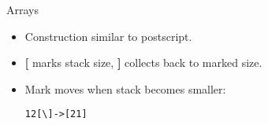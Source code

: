 \documentclass{beamer}
\begin{document}
%
%
%
%
%
%
%
%
%
%
%





\begin{frame}
    Arrays

    \begin{itemize}
        \item Construction similar to postscript.
        \item \textbf{[} marks stack size, \textbf{]} collects back to marked size.
        \item Mark moves when stack becomes smaller:\\
          \begin{alltt}
            1 2 [\textbackslash] -> [2 1]
          \end{alltt}

    \end{itemize}
\end{frame}
\end{document}
